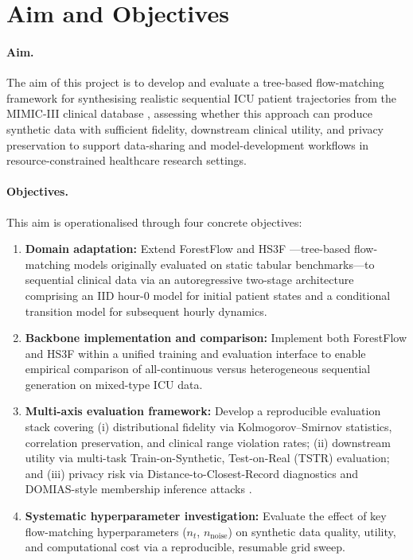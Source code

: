 \documentclass[11pt]{informatics-report}
\begin{document}
\section{Aim and Objectives}

\paragraph{Aim.}
The aim of this project is to develop and evaluate a tree-based flow-matching framework for synthesising realistic sequential ICU patient trajectories from the MIMIC-III clinical database \cite{johnson2016mimic}, assessing whether this approach can produce synthetic data with sufficient fidelity, downstream clinical utility, and privacy preservation to support data-sharing and model-development workflows in resource-constrained healthcare research settings.

\paragraph{Objectives.}
This aim is operationalised through four concrete objectives:

\begin{enumerate}
    \item \textbf{Domain adaptation:} Extend ForestFlow \cite{jolicoeur2023forest} and HS3F \cite{akazan2024hs3f}---tree-based flow-matching models originally evaluated on static tabular benchmarks---to sequential clinical data via an autoregressive two-stage architecture comprising an IID hour-0 model for initial patient states and a conditional transition model for subsequent hourly dynamics.
    \item \textbf{Backbone implementation and comparison:} Implement both ForestFlow and HS3F within a unified training and evaluation interface to enable empirical comparison of all-continuous versus heterogeneous sequential generation on mixed-type ICU data.
    \item \textbf{Multi-axis evaluation framework:} Develop a reproducible evaluation stack covering (i) distributional fidelity via Kolmogorov--Smirnov statistics, correlation preservation, and clinical range violation rates; (ii) downstream utility via multi-task Train-on-Synthetic, Test-on-Real (TSTR) evaluation; and (iii) privacy risk via Distance-to-Closest-Record diagnostics and DOMIAS-style membership inference attacks \cite{breugel2023domias}.
    \item \textbf{Systematic hyperparameter investigation:} Evaluate the effect of key flow-matching hyperparameters ($n_t$, $n_{\text{noise}}$) on synthetic data quality, utility, and computational cost via a reproducible, resumable grid sweep.
\end{enumerate}
\end{document}
